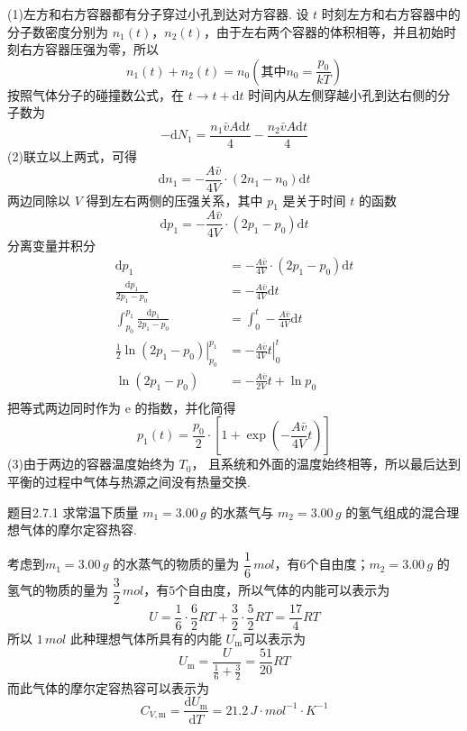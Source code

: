 \begin{solution}
    (1)左方和右方容器都有分子穿过小孔到达对方容器. 设 $t$ 时刻左方和右方容器中的分子数密度分别为 $n_1(t)$，$n_2(t)$，由于左右两个容器的体积相等，并且初始时刻右方容器压强为零，所以
    $$
        n_1(t) + n_2(t) = n_0 \left( \text{其中} n_0 = \frac{p_0}{kT} \right)
    $$
    按照气体分子的碰撞数公式，在 $t \to t+\mathrm{d}t$ 时间内从左侧穿越小孔到达右侧的分子数为
    $$
        -\mathrm{d}N_1 = \frac{n_1\bar{v}A\mathrm{d}t}{4} - \frac{n_2\bar{v}A\mathrm{d}t}{4}
    $$
    (2)联立以上两式，可得
    $$
        \mathrm{d}n_1 = -\frac{A\bar{v}}{4V} \cdot \left(2n_1 - n_0\right) \mathrm{d}t
    $$
    两边同除以 $V$ 得到左右两侧的压强关系，其中 $p_1$ 是关于时间 $t$ 的函数
    $$
        \mathrm{d} p_1  = -\frac{A\bar{v}}{4V} \cdot (2p_1 - p_0) \mathrm{d}t
    $$
    分离变量并积分
    $$
        \begin{aligned}
            \mathrm{d}p_1                                          & = -\frac{A\bar{v}}{4V} \cdot (2p_1 - p_0) \mathrm{d}t \\
            \frac{\mathrm{d}p_1}{2p_1 - p_0}                       & =  -\frac{A\bar{v}}{4V} \mathrm{d}t                   \\
            \int_{p_0}^{p_1} \frac{\mathrm{d}p_1}{2p_1 - p_0}      & = \int_0^t -\frac{A\bar{v}}{4V} \mathrm{d}t           \\
            \left. \frac{1}{2} \ln(2p_1 - p_0) \right|_{p_0}^{p_1} & = \left. -\frac{A\bar{v}}{4V} t \right|_0^t           \\
            \ln(2p_1 - p_0)                                        & = -\frac{A\bar{v}}{2V} t + \ln{p_0}                   \\
        \end{aligned}
    $$
    把等式两边同时作为 $\mathrm{e}$ 的指数，并化简得
    $$
        p_1(t) = \frac{p_0}{2} \cdot \left[1+\exp\left(-\frac{A\bar{v}}{4V}t\right) \right]
    $$
    (3)由于两边的容器温度始终为 $T_0$， 且系统和外面的温度始终相等，所以最后达到平衡的过程中气体与热源之间没有热量交换.
\end{solution}

\begin{question}{题目2.7.1}
    求常温下质量 $m_1=3.00 \,\si{g}$ 的水蒸气与 $m_2 = 3.00 \,\si{g}$ 的氢气组成的混合理想气体的摩尔定容热容.
\end{question}

\begin{solution}
    考虑到$m_1=3.00 \,\si{g}$ 的水蒸气的物质的量为 $\dfrac{1}{6} \,\si{mol}$，有$6$个自由度；$m_2 = 3.00 \,\si{g}$ 的氢气的物质的量为 $\dfrac{3}{2} \,\si{mol}$，有$5$个自由度，所以气体的内能可以表示为
    $$
        U = \frac{1}{6} \cdot \frac{6}{2}RT + \frac{3}{2} \cdot \frac{5}{2}RT
        = \frac{17}{4}RT
    $$
    所以 $1 \,\si{mol}$ 此种理想气体所具有的内能 $U_\mathrm{m}$可以表示为
    $$
        U_\mathrm{m} = \frac{U}{\frac{1}{6} + \frac{3}{2}} = \frac{51}{20}RT
    $$
    而此气体的摩尔定容热容可以表示为
    $$
        C_{V,\mathrm{m}}
        = \frac{\mathrm{d}U_\mathrm{m}}{\mathrm{d}T}
        = 21.2 \,\si{J \cdot mol^{-1} \cdot K^{-1}}
    $$
\end{solution}

